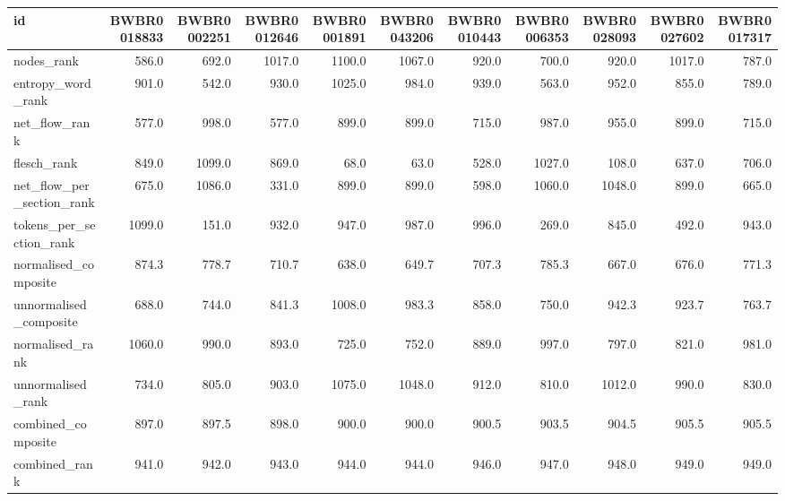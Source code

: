 \begin{tabular}{lrrrrrrrrrr}
\toprule
id & BWBR0018833 & BWBR0002251 & BWBR0012646 & BWBR0001891 & BWBR0043206 & BWBR0010443 & BWBR0006353 & BWBR0028093 & BWBR0027602 & BWBR0017317 \\
\midrule
nodes\_rank & 586.0 & 692.0 & 1017.0 & 1100.0 & 1067.0 & 920.0 & 700.0 & 920.0 & 1017.0 & 787.0 \\
\cline{1-11}
entropy\_word\_rank & 901.0 & 542.0 & 930.0 & 1025.0 & 984.0 & 939.0 & 563.0 & 952.0 & 855.0 & 789.0 \\
\cline{1-11}
net\_flow\_rank & 577.0 & 998.0 & 577.0 & 899.0 & 899.0 & 715.0 & 987.0 & 955.0 & 899.0 & 715.0 \\
\cline{1-11}
flesch\_rank & 849.0 & 1099.0 & 869.0 & 68.0 & 63.0 & 528.0 & 1027.0 & 108.0 & 637.0 & 706.0 \\
\cline{1-11}
net\_flow\_per\_section\_rank & 675.0 & 1086.0 & 331.0 & 899.0 & 899.0 & 598.0 & 1060.0 & 1048.0 & 899.0 & 665.0 \\
\cline{1-11}
tokens\_per\_section\_rank & 1099.0 & 151.0 & 932.0 & 947.0 & 987.0 & 996.0 & 269.0 & 845.0 & 492.0 & 943.0 \\
\cline{1-11}
normalised\_composite & 874.3 & 778.7 & 710.7 & 638.0 & 649.7 & 707.3 & 785.3 & 667.0 & 676.0 & 771.3 \\
\cline{1-11}
unnormalised\_composite & 688.0 & 744.0 & 841.3 & 1008.0 & 983.3 & 858.0 & 750.0 & 942.3 & 923.7 & 763.7 \\
\cline{1-11}
normalised\_rank & 1060.0 & 990.0 & 893.0 & 725.0 & 752.0 & 889.0 & 997.0 & 797.0 & 821.0 & 981.0 \\
\cline{1-11}
unnormalised\_rank & 734.0 & 805.0 & 903.0 & 1075.0 & 1048.0 & 912.0 & 810.0 & 1012.0 & 990.0 & 830.0 \\
\cline{1-11}
combined\_composite & 897.0 & 897.5 & 898.0 & 900.0 & 900.0 & 900.5 & 903.5 & 904.5 & 905.5 & 905.5 \\
\cline{1-11}
combined\_rank & 941.0 & 942.0 & 943.0 & 944.0 & 944.0 & 946.0 & 947.0 & 948.0 & 949.0 & 949.0 \\
\cline{1-11}
\bottomrule
\end{tabular}
